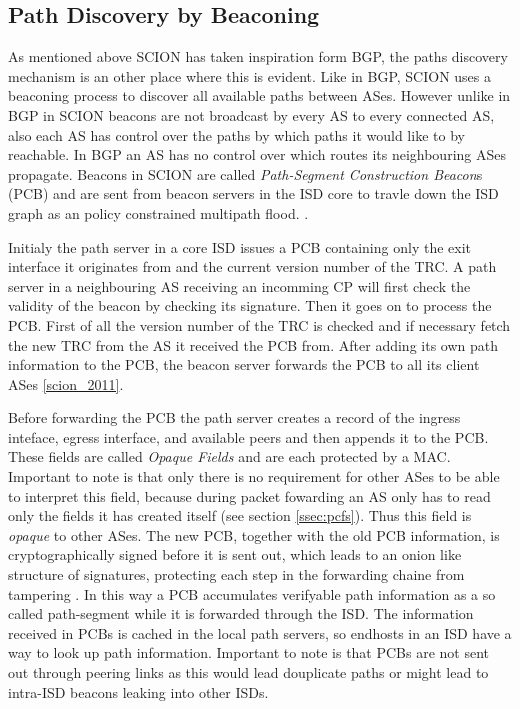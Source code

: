 \documentclass[../eva1_scion.tex]{subfiles}
\begin{document}
    \subsection{Path Discovery by Beaconing}\label{ssec:beaconing}
    As mentioned above SCION has taken inspiration form BGP, the paths discovery mechanism is an other place where this is evident. Like in BGP, SCION uses a beaconing process to discover all available paths between ASes. However unlike in BGP in SCION beacons are not broadcast by every AS to every connected AS, also each AS has control over the paths by which paths it would like to by reachable. In BGP an AS has no control over which routes its neighbouring ASes propagate. Beacons in SCION are called \textit{Path-Segment Construction Beacon}s (PCB) and are  sent from beacon servers in the ISD core to travle down the ISD graph as an policy constrained multipath flood. \cite{scion_2011}.

    Initialy the path server in a core ISD issues a PCB containing only the exit interface it originates from and the current version number of the TRC. A path server in a neighbouring AS receiving an incomming CP will first check the validity of the beacon by checking its signature. Then it goes on to process the PCB. First of all the version number of the TRC is checked and if necessary fetch the new TRC from the AS it received the PCB from. After adding its own path information to the PCB, the beacon server forwards the PCB to all its client ASes \ref{scion_2011}.

    Before forwarding the PCB the path server creates a record of the ingress inteface, egress interface, and available peers and then appends it to the PCB. These fields are called \textit{Opaque Fields} and are each protected by a MAC. Important to note is that only there is no requirement for other ASes to be able to interpret this field, because during packet fowarding an AS only has to read only the fields it has created itself (see section \ref{ssec:pcfs}). Thus this field is \textit{opaque} to other ASes. The new PCB, together with the old PCB information, is cryptographically signed before it is sent out, which leads to an onion like structure of signatures, protecting each step in the forwarding chaine from tampering \cite{scion_2011}. In this way a PCB accumulates verifyable path information as a so called path-segment while it is forwarded through the ISD. The information received in PCBs is cached in the local path servers, so endhosts in an ISD have a way to look up path information. Important to note is that PCBs are not sent out through peering links as this would lead douplicate paths or might lead to intra-ISD beacons leaking into other ISDs.
\end{document}
